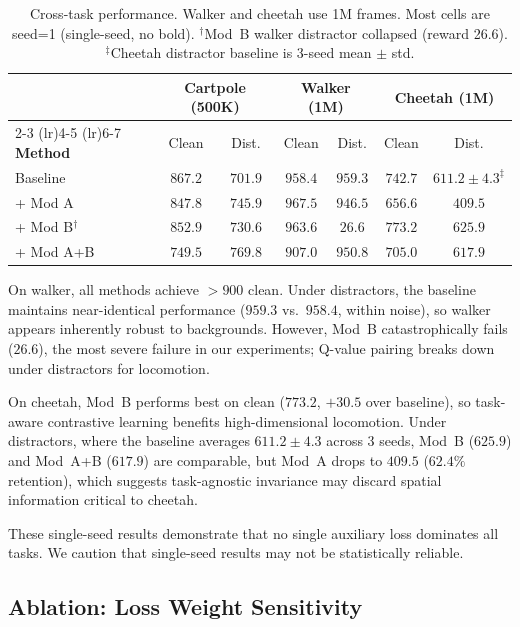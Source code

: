 \documentclass{article}
\begin{document}
\begin{table}[h]
\centering
\caption{Cross-task performance. Walker and cheetah use 1M frames. Most cells are seed=1 (single-seed, no bold). $^\dagger$Mod~B walker distractor collapsed (reward 26.6). $^\ddagger$Cheetah distractor baseline is 3-seed mean $\pm$ std.}
\label{tab:multi_task}
\begin{tabular}{l cc cc cc}
\toprule
& \multicolumn{2}{c}{\textbf{Cartpole} (500K)} & \multicolumn{2}{c}{\textbf{Walker} (1M)} & \multicolumn{2}{c}{\textbf{Cheetah} (1M)} \\
\cmidrule(lr){2-3} \cmidrule(lr){4-5} \cmidrule(lr){6-7}
\textbf{Method} & Clean & Dist. & Clean & Dist. & Clean & Dist. \\
\midrule
Baseline       & $867.2$ & $701.9$ & $958.4$ & $959.3$ & $742.7$ & $611.2 \pm 4.3^\ddagger$ \\
+ Mod A        & $847.8$ & $745.9$ & $967.5$ & $946.5$ & $656.6$ & $409.5$ \\
+ Mod B$^\dagger$  & $852.9$ & $730.6$ & $963.6$ & $26.6$  & $773.2$ & $625.9$ \\
+ Mod A+B      & $749.5$ & $769.8$ & $907.0$ & $950.8$ & $705.0$ & $617.9$ \\
\bottomrule
\end{tabular}
\end{table}

On walker, all methods achieve $>900$ clean. Under distractors, the baseline maintains near-identical performance ($959.3$ vs.\ $958.4$, within noise), so walker appears inherently robust to backgrounds. However, Mod~B catastrophically fails ($26.6$), the most severe failure in our experiments; Q-value pairing breaks down under distractors for locomotion.

On cheetah, Mod~B performs best on clean ($773.2$, $+30.5$ over baseline), so task-aware contrastive learning benefits high-dimensional locomotion. Under distractors, where the baseline averages $611.2 \pm 4.3$ across 3 seeds, Mod~B ($625.9$) and Mod~A+B ($617.9$) are comparable, but Mod~A drops to $409.5$ ($62.4\%$ retention), which suggests task-agnostic invariance may discard spatial information critical to cheetah.

These single-seed results demonstrate that no single auxiliary loss dominates all tasks. We caution that single-seed results may not be statistically reliable.

\subsection{Ablation: Loss Weight Sensitivity}
\label{sec:alpha}
\end{document}
